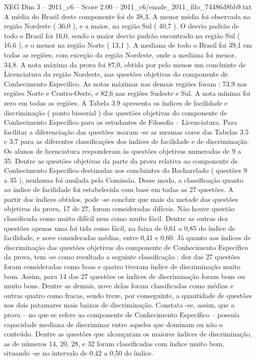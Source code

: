 \begin{textsample}{NEG Dim 3 – 2011\_c6 – Score 2.00 – 2011\_c6/enade\_2011\_filo\_74486d8bb9.txt}
A média do Brasil deste componente foi de 38,3.
A menor média foi observada na região Nordeste ( 36,0 ), e a maior, na região Sul ( 40,7 ).
O desvio padrão de todo o Brasil foi 16,0, sendo o maior desvio padrão encontrado na região Sul ( 16,6 ), e o menor na região Norte ( 13,1 ).
A mediana de todo o Brasil foi 39,1 em todas as regiões, com exceção da região Nordeste, onde a mediana foi menor, 34,8.
A nota máxima da prova foi 87,0, obtida por pelo menos um concluinte de Licenciatura da região Nordeste, nas questões objetivas do componente de Conhecimento Específico.
As notas máximas nas demais regiões foram : 73,9 nas regiões Norte e Centro-Oeste, e 82,6 nas regiões Sudeste e Sul.
A nota mínima foi zero em todas as regiões.
A Tabela 3.9 apresenta os índices de facilidade e discriminação ( ponto bisserial ) das questões objetivas do componente de Conhecimento Específico para os estudantes de Filosofia – Licenciatura.
Para facilitar a diferenciação das questões usaram -se as mesmas cores das Tabelas 3.5 e 3.7 para as diferentes classificações dos índices de facilidade e de discriminação.
Os alunos de licenciatura responderam às questões objetivas numeradas de 9 a 35.
Dentre as questões objetivas da parte da prova relativa ao componente de Conhecimento Específico destinadas aos concluintes do Bacharelado ( questões 9 a 35 ), nenhuma foi anulada pela Comissão.
Desse modo, a classificação quanto ao índice de facilidade foi estabelecida com base em todas as 27 questões.
A partir dos índices obtidos, pode -se concluir que mais da metade das questões objetivas da prova, 17 de 27, foram consideradas difíceis.
Não houve questão classificada como muito difícil nem como muito fácil.
Dentre as outras dez questões apenas uma foi tida como fácil, na faixa de 0,61 a 0,85 do índice de facilidade, e nove consideradas médias, entre 0,41 e 0,60.
Já quanto aos índices de discriminação das questões objetivas do componente de Conhecimento Específico da prova, tem -se como resultado a seguinte classificação : dez das 27 questões foram consideradas como boas e quatro tiveram índice de discriminação muito bom.
Assim, para 14 das 27 questões os índices de discriminação foram bons ou muito bons.
Dentre as demais, nove delas foram classificadas como médias e outras quatro como fracas, sendo treze, por conseguinte, a quantidade de questões nos dois patamares mais baixos de discriminação.
Constata -se, assim, que a prova – no que se refere ao componente de Conhecimento Específico – possuía capacidade mediana de discriminar entre aqueles que dominam ou não o conteúdo.
Dentre as questões que alcançaram os maiores índices de discriminação, as de números 14, 20, 28, e 32 foram classificadas com índice muito bom, situando -se no intervalo de 0,42 a 0,50 do índice.

\end{textsample}
